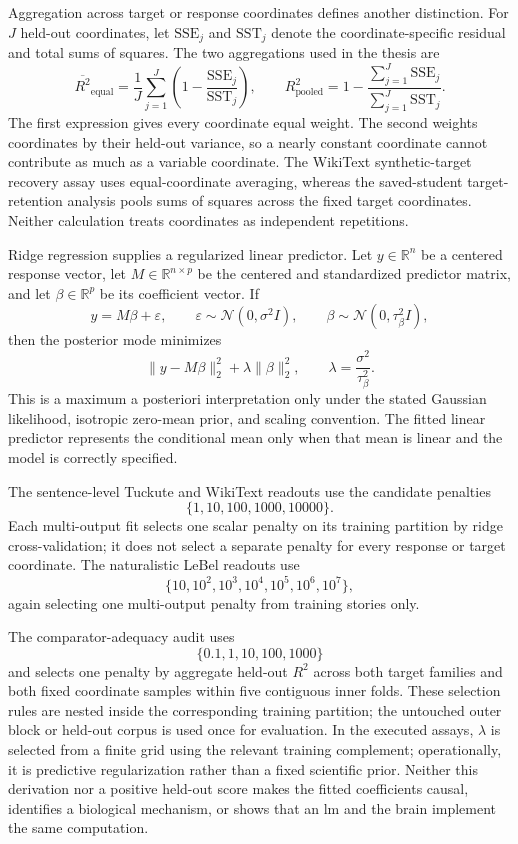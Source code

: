 Aggregation across target or response coordinates defines another distinction.
For \(J\) held-out coordinates, let \(\mathrm{SSE}_j\) and \(\mathrm{SST}_j\) denote the coordinate-specific residual and total sums of squares.
The two aggregations used in the thesis are
\begin{equation}
  \overline{R^2}_{\mathrm{equal}}
  =
  \frac{1}{J}\sum_{j=1}^{J}
  \left(1-\frac{\mathrm{SSE}_j}{\mathrm{SST}_j}\right),
  \qquad
  R^2_{\mathrm{pooled}}
  =
  1-\frac{\sum_{j=1}^{J}\mathrm{SSE}_j}
           {\sum_{j=1}^{J}\mathrm{SST}_j}.
  \label{eq:coordinate-aggregation}
\end{equation}
The first expression gives every coordinate equal weight.
The second weights coordinates by their held-out variance, so a nearly constant coordinate cannot contribute as much as a variable coordinate.
The WikiText synthetic-target recovery assay uses equal-coordinate averaging, whereas the saved-student target-retention analysis pools sums of squares across the fixed target coordinates.
Neither calculation treats coordinates as independent repetitions. 

Ridge regression supplies a regularized linear predictor.
Let \(y\in\mathbb R^n\) be a centered response vector, let \(M\in\mathbb R^{n\times p}\) be the centered and standardized predictor matrix, and let \(\beta\in\mathbb R^p\) be its coefficient vector.
If
\[
  y=M\beta+\varepsilon,
  \qquad
  \varepsilon\sim\mathcal N(0,\sigma^2I),
  \qquad
  \beta\sim\mathcal N(0,\tau_\beta^2I),
\]
then the posterior mode minimizes
\[
  \lVert y-M\beta\rVert_2^2
  +
  \lambda\lVert\beta\rVert_2^2,
  \qquad
  \lambda=\frac{\sigma^2}{\tau_\beta^2}.
\]
This is a maximum a posteriori interpretation only under the stated Gaussian likelihood, isotropic zero-mean prior, and scaling convention.
The fitted linear predictor represents the conditional mean only when that mean is linear and the model is correctly specified.

The sentence-level Tuckute and WikiText readouts use the candidate penalties
\[
\{1,10,100,1000,10000\}.
\]
Each multi-output fit selects one scalar penalty on its training partition by ridge cross-validation; it does not select a separate penalty for every response or target coordinate.
The naturalistic LeBel readouts use
\[
\{10,10^2,10^3,10^4,10^5,10^6,10^7\},
\]
again selecting one multi-output penalty from training stories only.

The comparator-adequacy audit uses
\[
\{0.1,1,10,100,1000\} %
\]
and selects one penalty by aggregate held-out \(R^2\) across both target families and both fixed coordinate samples within five contiguous inner folds.
These selection rules are nested inside the corresponding training partition; the untouched outer block or held-out corpus is used once for evaluation.
In the executed assays, \(\lambda\) is selected from a finite grid using the relevant training complement; operationally, it is predictive regularization rather than a fixed scientific prior.
Neither this derivation nor a positive held-out score makes the fitted coefficients causal, identifies a biological mechanism, or shows that an \ac{lm} and the brain implement the same computation.

